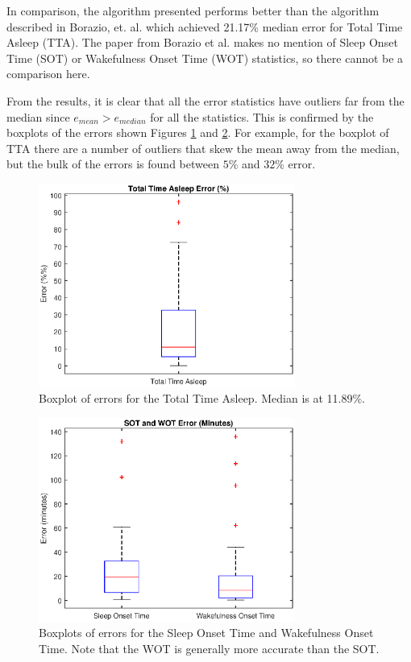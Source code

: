             In comparison, the algorithm presented performs better than the algorithm described in Borazio, et. al. \cite{borazio} which achieved 21.17\% median error for Total Time Asleep (TTA). The paper from Borazio et al. makes no mention of Sleep Onset Time (SOT) or Wakefulness Onset Time (WOT) statistics, so there cannot be a comparison here.

            From the results, it is clear that all the error statistics have outliers far from the median since $e_{mean} > e_{median}$ for all the statistics. This is confirmed by the boxplots of the errors shown Figures \ref{img_tta_error} and \ref{img_sot_wot_error}. For example, for the boxplot of TTA there are a number of outliers that skew the mean away from the median, but the bulk of the errors is found between $5\%$ and $32\%$ error. 

            \begin{figure}[h]
                \includegraphics[width=0.75\textwidth]{Images/tta_error.eps}
                \centering
                \caption{Boxplot of errors for the Total Time Asleep. Median is at 11.89\%.}
                \label{img_tta_error}
            \end{figure}

            \begin{figure}[h]
                \includegraphics[width=0.75\textwidth]{Images/sot_wot_error.eps}
                \centering
                \caption{Boxplots of errors for the Sleep Onset Time and Wakefulness Onset Time. Note that the WOT is generally more accurate than the SOT.}
                \label{img_sot_wot_error}
            \end{figure}

